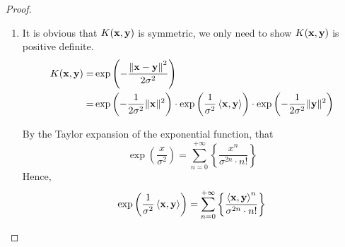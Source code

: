 \begin{proof}
	\begin{enumerate}
		\item It is obvious that \(K(\mathbf{x},\mathbf{y})\) is symmetric, we only need to show \(K(\mathbf{x},\mathbf{y})\) is positive definite.
		      \begin{equation*}
			      \begin{aligned}
				      K(\mathbf{x},\mathbf{y})= & \exp\left(-\frac{\left\|\mathbf{x}-\mathbf{y}\right\|^{2}}{2\sigma^{2}}\right)                                                                                                                            \\
				      =                   & \exp\left(-\frac{1}{2\sigma^{2}}\|\mathbf{x}\|^{2}\right)\cdot\exp\left(\frac{1}{\sigma^{2}}\left\langle\mathbf{x},\mathbf{y}\right\rangle\right)\cdot\exp\left(-\frac{1}{2\sigma^{2}}\|\mathbf{y}\|^{2}\right)
			      \end{aligned}
		      \end{equation*}

		      By the Taylor expansion of the exponential function, that
		      \begin{equation*}
			      \exp\left(\frac{x}{\sigma^{2}}\right)=\sum_{n=0}^{+\infty}\left\{\frac{x^{n}}{\sigma^{2n}\cdot n!}\right\}
		      \end{equation*}
		      Hence,
		      \begin{equation*}
			      \exp\left(\frac{1}{\sigma^{2}}\left\langle\mathbf{x},\mathbf{y}\right\rangle\right)=\sum_{n=0}^{+\infty}\left\{\frac{\left\langle\mathbf{x},\mathbf{y}\right\rangle^{n}}{\sigma^{2n}\cdot n!}\right\}
		      \end{equation*}


\end{enumerate}
\end{proof}
